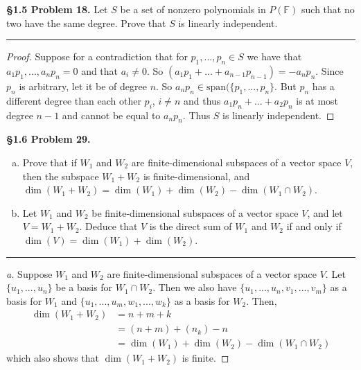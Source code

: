 \documentclass[leqno]{article}
\theoremstyle{nonumberplain}
\newtheorem{proof}{Proof}
\begin{document}


\noindent\textbf{\S 1.5 Problem 18.} Let $S$ be a set of nonzero polynomials in $P(\mathbb{F})$ such that no two have the same degree.  Prove that $S$ is linearly independent.

\noindent\rule[0.5ex]{\linewidth}{1pt}

\begin{proof}
Suppose for a contradiction that for $p_1,...,p_n\in S$ we have that $a_1p_1,...,a_np_n=0$ and that $a_i\neq 0$.  So $(a_1p_1+...+a_{n-1}p_{n-1})=-a_np_n.$  Since $p_n$ is arbitrary, let it be of degree $n$. So $a_np_n \in \textrm{span}(\{p_1,...,p_n\}$.  But $p_n$ has a different degree than each other $p_i$, $i\neq n$ and thus $a_1p_n+...+a_2p_n$ is at most degree $n-1$ and cannot be equal to $a_np_n$.  Thus $S$ is linearly independent.
\end{proof}
\pagebreak




\noindent\textbf{\S 1.6 Problem 29.} 
\begin{enumerate}[(a)]
\item Prove that if $W_1$ and $W_2$ are finite-dimensional subspaces of a vector space $V$, then the subspace $W_1+W_2$ is finite-dimensional, and $\dim(W_1+W_2)=\dim(W_1)+\dim(W_2)-\dim(W_1\cap W_2)$.
\item Let $W_1$ and $W_2$ be finite-dimensional subspaces of a vector space $V$, and let $V=W_1+W_2$. Deduce that $V$ is the direct sum of $W_1$ and $W_2$ if and only if $\dim(V)=\dim(W_1)+\dim(W_2)$.
\end{enumerate}

\noindent\rule[0.5ex]{\linewidth}{1pt}

\begin{proof}[a]
Suppose $W_1$ and $W_2$ are finite-dimensional subspaces of a vector space $V$.  Let $\{u_1,...,u_n\}$ be a basis for $W_1\cap W_2$.  Then we also have $\{u_1,...,u_n,v_1,...,v_m\}$ as a basis for $W_1$ and $\{u_1,...,u_m,w_1,...,w_k\}$ as a basis for $W_2$. Then,
\begin{align*}
\dim(W_1+W_2)&=n+m+k\\
&=(n+m)+(n_k)-n\\
&=\dim(W_1)+\dim(W_2)-\dim(W_1\cap W_2)
\end{align*}
which also shows that $\dim(W_1+W_2)$ is finite.
\end{proof}
\end{document}
